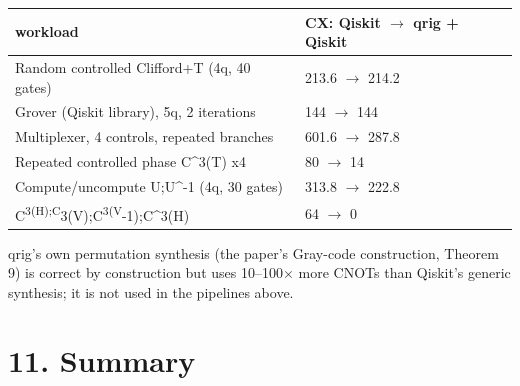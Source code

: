 \documentclass[
  10pt,
]{article}
\newcounter{none} %
\begin{document}
{\def\LTcaptype{none} %
\begin{longtable}[]{@{}ll@{}}
\toprule\noalign{}
workload & CX: Qiskit \ensuremath{\rightarrow} qrig + Qiskit \\
\midrule\noalign{}
\endhead
\bottomrule\noalign{}
\endlastfoot
Random controlled Clifford+T (4q, 40 gates) & 213.6 \ensuremath{\rightarrow} 214.2 \\
Grover (Qiskit library), 5q, 2 iterations & 144 \ensuremath{\rightarrow} 144 \\
Multiplexer, 4 controls, repeated branches & 601.6 \ensuremath{\rightarrow} 287.8 \\
Repeated controlled phase C\^{}3(T) x4 & 80 \ensuremath{\rightarrow} 14 \\
Compute/uncompute U;U\^{}-1 (4q, 30 gates) & 313.8 \ensuremath{\rightarrow} 222.8 \\
C\textsuperscript{3(H);C}3(V);C\textsuperscript{3(V}-1);C\^{}3(H) & 64 \ensuremath{\rightarrow}
0 \\
\end{longtable}
}

qrig's own permutation synthesis (the paper's Gray-code construction,
Theorem 9) is correct by construction but uses 10--100\ensuremath{\times} more CNOTs than
Qiskit's generic synthesis; it is not used in the pipelines above.

\section{11. Summary}\label{summary}
\end{document}
